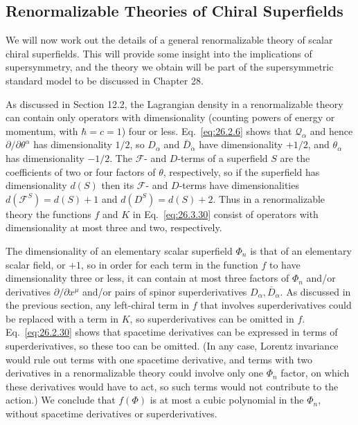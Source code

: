 
\subsection{Renormalizable Theories of Chiral Superfields}

\providecommand{\SuperQ}{\mathcal{Q}}

We will now work out the details of a general renormalizable theory of scalar
chiral superfields. This will provide some insight into the implications of
supersymmetry, and the theory we obtain will be part of the supersymmetric
standard model to be discussed in Chapter 28.

As discussed in Section 12.2, the Lagrangian density in a renormalizable theory
can contain only operators with dimensionality (counting powers of energy or
momentum, with \(\hbar=c=1\)) four or less. Eq.~\eqref{eq:26.2.6} shows that
\(\SuperQ_\alpha\) and hence \(\partial/\partial\theta^\alpha\) has
dimensionality \(1/2\), so \(D_\alpha\) and \(\bar D_{\dot\alpha}\) have
dimensionality \(+1/2\), and
\(\theta_\alpha\) has dimensionality \(-1/2\). The \(\mathcal{F}\)- and
\(D\)-terms of a superfield \(S\) are the coefficients of two or four factors
of \(\theta\), respectively, so if the superfield has dimensionality \(d(S)\)
then its \(\mathcal{F}\)- and \(D\)-terms have dimensionalities
\(d(\mathcal{F}^S)=d(S)+1\) and \(d(D^S)=d(S)+2\). Thus in a renormalizable
theory the functions \(f\) and \(K\) in Eq.~\eqref{eq:26.3.30} consist of
operators with dimensionality at most three and two, respectively.

The dimensionality of an elementary scalar superfield \(\Phi_n\) is that of an
elementary scalar field, or \(+1\), so in order for each term in the function
\(f\) to have dimensionality three or less, it can contain at most three
factors of \(\Phi_n\) and/or derivatives \(\partial/\partial x^\mu\) and/or
pairs of spinor superderivatives \(D_\alpha,\bar D_{\dot\alpha}\). As discussed in the
previous section, any left-chiral term in \(f\) that involves superderivatives
could be replaced with a term in \(K\), so superderivatives can be omitted in
\(f\). Eq.~\eqref{eq:26.2.30} shows that spacetime derivatives can be expressed
in terms of superderivatives, so these too can be omitted. (In any case,
Lorentz invariance would rule out terms with one spacetime derivative, and
terms with two derivatives in a renormalizable theory could involve only one
\(\Phi_n\) factor, on which these derivatives would have to act, so such terms
would not contribute to the action.) We conclude that \(f(\Phi)\) is at most a
cubic polynomial in the \(\Phi_n\), without spacetime derivatives or
superderivatives.

